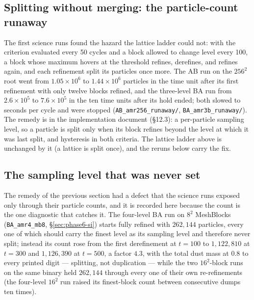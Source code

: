 \documentclass[11pt]{article}
\newcommand{\code}[1]{\texttt{#1}}
\newcommand{\file}[1]{\texttt{#1}}
\begin{document}
\subsection{Splitting without merging: the particle-count runaway}
\label{sec:phase6-runaway}

The first science runs found the hazard the lattice ladder could not: with the criterion
evaluated every 50 cycles and a block allowed to change level every 100, a block whose
maximum hovers at the threshold refines, derefines, and refines again, and each
refinement split its particles once more. The AB run on the $256^2$ root went from
$1.05\times10^6$ to $1.44\times10^6$ particles in the time unit after its first
refinement with only twelve blocks refined, and the three-level BA run from
$2.6\times10^5$ to $7.6\times10^5$ in the ten time units after its hold ended; both
slowed to seconds per cycle and were stopped (\file{AB\_amr256\_runaway/},
\file{BA\_amr3b\_runaway/}). The remedy is in the implementation document
(\S12.3): a per-particle sampling level, so a particle is split only when its block
refines beyond the level at which it was last split, and hysteresis in both criteria.
The lattice ladder above is unchanged by it (a lattice is split once), and the reruns
below carry the fix.

\subsection{The sampling level that was never set}
\label{sec:phase6-plev}

The remedy of the previous section had a defect that the science runs exposed only
through their particle counts, and it is recorded here because the count is the one
diagnostic that catches it. The four-level BA run on $8^2$ MeshBlocks
(\code{BA\_amr4\_mb8}, \S\ref{sec:phase6-si}) starts fully refined with $262{,}144$
particles, every one of which should carry the finest level as its sampling level and
therefore never split; instead its count rose from the first derefinement at $t = 100$ to
$1{,}122{,}810$ at $t = 300$ and $1{,}126{,}390$ at $t = 500$, a factor $4.3$, with the
total dust mass at $0.8$ to every printed digit --- splitting, not duplication --- while
the two $16^2$-block runs on the same binary held $262{,}144$ through every one of their
own re-refinements (the four-level $16^2$ run raised its finest-block count between
consecutive dumps ten times).
\end{document}
